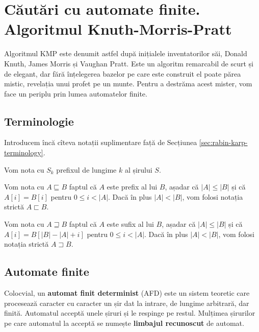 \documentclass[../main.tex]{subfiles}
\begin{document}
\chapter{Căutări cu automate finite. Algoritmul Knuth-Morris-Pratt}
\label{chapter:kmp}


Algoritmul KMP este denumit astfel după inițialele inventatorilor săi, Donald
Knuth, James Morris și Vaughan Pratt. Este un algoritm remarcabil de scurt și
de elegant, dar fără înțelegerea bazelor pe care este construit el poate
părea mistic, revelația unui profet pe un munte. Pentru a destrăma acest
mister, vom face un periplu prin lumea automatelor finite.


\section{Terminologie}

Introducem încă cîteva notații suplimentare față de Secțiunea
\ref{sec:rabin-karp-terminology}.

\begin{notation}
  Vom nota cu $S_k$ prefixul de lungime $k$ al șirului $S$.
\end{notation}

\begin{notation}
  Vom nota cu $A \sqsubseteq B$ faptul că $A$ este prefix al lui $B$, așadar
  că $|A| \leq |B|$ și că $A[i] = B[i]$ pentru $0 \leq i < |A|$. Dacă în plus
  $|A| < |B|$, vom folosi notația strictă $A \sqsubset B$.
\end{notation}

\begin{notation}
  Vom nota cu $A \sqsupseteq B$ faptul că $A$ este sufix al lui $B$, așadar că
  $|A| \leq |B|$ și că $A[i] = B[|B| - |A| + i]$ pentru $0 \leq i < |A|$. Dacă
  în plus $|A| < |B|$, vom folosi notația strictă $A \sqsupset B$.
\end{notation}


\section{Automate finite}

Colocvial, un \textbf{automat finit determinist} (AFD) este un sistem teoretic
care procesează caracter cu caracter un șir dat la intrare, de lungime
arbitrară, dar finită. Automatul acceptă unele șiruri și le respinge pe
restul. Mulțimea șirurilor pe care automatul la acceptă se numește
\textbf{limbajul recunoscut} de automat.
\end{document}
